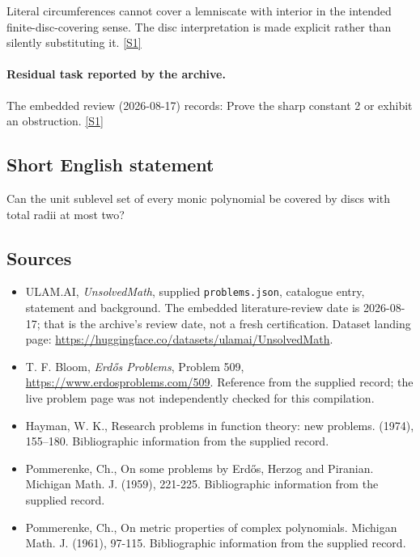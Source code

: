 \documentclass[11pt,a4paper]{article}
\newcommand{\sref}[2]{\hyperlink{source:#1:#2}{[S#2]}}
\begin{document}
Literal circumferences cannot cover a lemniscate with interior in the intended finite-disc-covering sense. The disc interpretation is made explicit rather than silently substituting it. \sref{statement}{1}

\paragraph{Residual task reported by the archive.}

The embedded review (2026-08-17) records: Prove the sharp constant 2 or exhibit an obstruction. \sref{statement}{1}

\subsection{Short English statement}

Can the unit sublevel set of every monic polynomial be covered by discs with total radii at most two?

\subsection{Sources}

{\small

\begin{itemize}

\item[\hypertarget{source:statement:1}{S1}] ULAM.AI, \emph{UnsolvedMath}, supplied \texttt{problems.json}, catalogue entry, statement and background. The embedded literature-review date is 2026-08-17; that is the archive’s review date, not a fresh certification. Dataset landing page: \url{https://huggingface.co/datasets/ulamai/UnsolvedMath}.

\item[\hypertarget{source:statement:2}{S2}] T. F. Bloom, \emph{Erdős Problems}, Problem 509, \url{https://www.erdosproblems.com/509}. Reference from the supplied record; the live problem page was not independently checked for this compilation.

\item[\hypertarget{source:statement:3}{S3}] Hayman, W. K., Research problems in function theory: new problems. (1974), 155--180. Bibliographic information from the supplied record.

\item[\hypertarget{source:statement:4}{S4}] Pommerenke, Ch., On some problems by Erd\H{o}s, Herzog and Piranian. Michigan Math. J. (1959), 221-225. Bibliographic information from the supplied record.

\item[\hypertarget{source:statement:5}{S5}] Pommerenke, Ch., On metric properties of complex polynomials. Michigan Math. J. (1961), 97-115. Bibliographic information from the supplied record.

\end{itemize}

}

\label{end:statement}
\end{document}
